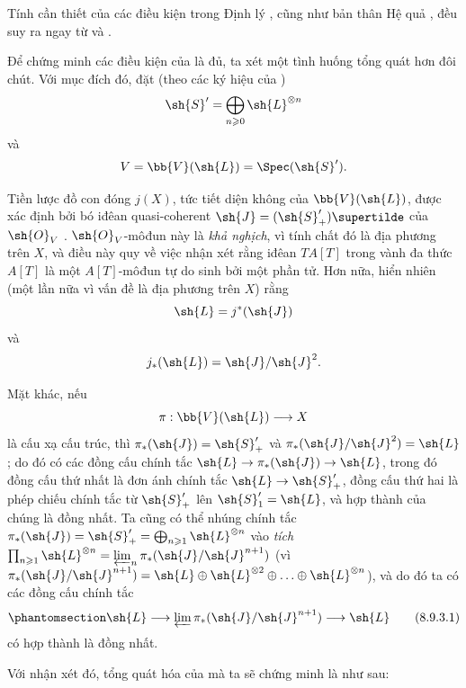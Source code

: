 \documentclass[oneside,10pt]{amsart}
\makeatletter
\renewcommand{\geq}{\geqslant}
\newcommand{\ega@arrow}[2]{\mathchoice{#1}{#2}{#2}{#2}}
\renewcommand{\to}{\ega@arrow{\longrightarrow}{\rightarrow}}
\let\EGAOriginalLabel\label
\renewcommand{\label}[1]{\phantomsection\EGAOriginalLabel{#1}}
\makeatother
\begin{document}
\begin{env}[8.9.3]
\label{II.8.9.3}
Tính cần thiết của các điều kiện trong Định lý , cũng như bản thân Hệ quả , đều suy ra ngay từ  và .

Để chứng minh các điều kiện của  là đủ, ta xét một tình huống tổng quát hơn đôi chút.
Với mục đích đó, đặt (theo các ký hiệu của )
\[
  \sh{S}'=\bigoplus_{n\geq 0}\sh{L}^{\otimes n}
\]
và
\[
  V=\bb{V}(\sh{L})=\Spec(\sh{S}').
\]

Tiền lược đồ con đóng $j(X)$, tức tiết diện không của $\bb{V}(\sh{L})$, được xác định bởi bó iđêan quasi-coherent $\sh{J}=(\sh{S}'_+)\supertilde$ của $\sh{O}_V$ .
$\sh{O}_V$-môđun này là \emph{khả nghịch}, vì tính chất đó là địa phương trên $X$, và điều này quy về việc nhận xét rằng iđêan $TA[T]$ trong vành đa thức $A[T]$ là một $A[T]$-môđun tự do sinh bởi một phần tử.
Hơn nữa, hiển nhiên (một lần nữa vì vấn đề là địa phương trên $X$) rằng
\[
  \sh{L}=j^*(\sh{J})
\]
và
\[
  j_*(\sh{L})=\sh{J}/\sh{J}^2.
\]

Mặt khác, nếu
\[
  \pi:\bb{V}(\sh{L})\to X
\]
là cấu xạ cấu trúc, thì $\pi_*(\sh{J})=\sh{S}'_+$ và $\pi_*(\sh{J}/\sh{J}^2)=\sh{L}$;
do đó có các đồng cấu chính tắc $\sh{L}\to\pi_*(\sh{J})\to\sh{L}$, trong đó đồng cấu thứ nhất là đơn ánh chính tắc $\sh{L}\to\sh{S}'_+$, đồng cấu thứ hai là phép chiếu chính tắc từ $\sh{S}'_+$ lên $\sh{S}'_1=\sh{L}$, và hợp thành của chúng là đồng nhất.
Ta cũng có thể nhúng chính tắc $\pi_*(\sh{J}) = \sh{S}'_+ = \bigoplus_{n\geq1}\sh{L}^{\otimes n}$ vào \emph{tích} $\prod_{n\geq1}\sh{L}^{\otimes n} = \varprojlim_n \pi_*(\sh{J}/\sh{J}^{n+1})$ (vì $\pi_*(\sh{J}/\sh{J}^{n+1}) = \sh{L}\oplus\sh{L}^{\otimes 2}\oplus\ldots\oplus\sh{L}^{\otimes n}$), và do đó ta có các đồng cấu chính tắc
\[
\label{II.8.9.3.1}
  \sh{L}\to\varprojlim\pi_*(\sh{J}/\sh{J}^{n+1})\to\sh{L}
  \tag{8.9.3.1}
\]
có hợp thành là đồng nhất.

Với nhận xét đó, tổng quát hóa của  mà ta sẽ chứng minh là như sau:
\end{env}
\end{document}
